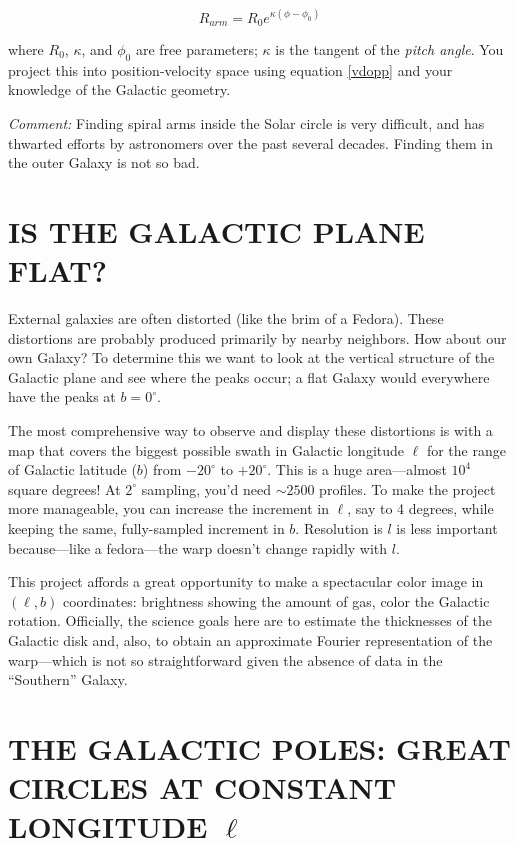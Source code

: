 \documentclass[psfig,preprint]{aastex}
\begin{document}
\begin{enumerate}
\begin{equation}
R_{arm}  =  R_0 e^ {\kappa (\phi - \phi_0)} 
\end{equation}

\noindent where $R_0$, $\kappa$, and $\phi_0$ are free parameters;
$\kappa$ is the tangent of the {\it pitch angle}.  You project this into
position-velocity space using equation \ref{vdopp} and your knowledge of
the Galactic geometry.  

{\it Comment:} Finding spiral arms inside the Solar circle is very
difficult, and has thwarted efforts by astronomers over the past several
decades. Finding them in the outer Galaxy is not so bad.

\end{enumerate}

\section{IS THE GALACTIC PLANE FLAT?}

External galaxies are often distorted (like the brim of a Fedora). 
These distortions are probably produced primarily by nearby neighbors. 
How about our own Galaxy? To determine this we want to look at the
vertical structure of the Galactic plane and see where the peaks occur;
a flat Galaxy would everywhere have the peaks at $b=0^\circ$. 

The most comprehensive way to observe and display these distortions is
with a map that covers the biggest possible swath in Galactic longitude
$\ell$ for the range of Galactic latitude ($b$) from $-20^\circ$ to
$+20^\circ$. This is a huge area---almost $10^4$ square degrees! At
$2^\circ$ sampling, you'd need $\sim 2500$ profiles.  To make the
project more manageable, you can increase the increment in $\ell$, say
to 4 degrees, while keeping the same, fully-sampled increment in
$b$. Resolution is $l$ is less important because---like a
fedora---the warp doesn't change rapidly with $l$.

This project affords a great opportunity to make a spectacular color
image in $(\ell,b)$ coordinates: brightness showing the amount of gas,
color the Galactic rotation.  Officially, the science goals here are to
estimate the thicknesses of the Galactic disk and, also, to obtain an
approximate Fourier representation of the warp---which is not so
straightforward given the absence of data in the ``Southern'' Galaxy.

\section{THE GALACTIC POLES: GREAT CIRCLES AT CONSTANT LONGITUDE $\ell$}
\label{galacticpoles}
\end{document}
